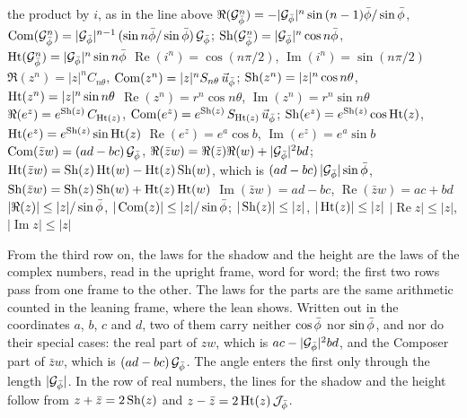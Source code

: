 \begin{gnlawswide}
  {the product by $i$, \newline as in the line above}
  {$\Re(\mathcal{G}_{\bar{\phi}}^n) = -|\mathcal{G}_{\bar{\phi}}|^n\sin\,(n - 1)\bar{\phi}/\sin\bar{\phi}$, \quad $\operatorname{Com}(\mathcal{G}_{\bar{\phi}}^n) = |\mathcal{G}_{\bar{\phi}}|^{n-1}\,(\sin n\bar{\phi}/\sin\bar{\phi})\,\mathcal{G}_{\bar{\phi}}$; \newline $\operatorname{Sh}(\mathcal{G}_{\bar{\phi}}^n) = |\mathcal{G}_{\bar{\phi}}|^n\cos n\bar{\phi}$, \quad $\operatorname{Ht}(\mathcal{G}_{\bar{\phi}}^n) = |\mathcal{G}_{\bar{\phi}}|^n\sin n\bar{\phi}$}
  {$\operatorname{Re}(i^n) = \cos(n\pi/2)$, \newline $\operatorname{Im}(i^n) = \sin(n\pi/2)$}
  {$\Re(z^n) = |z|^n C_{n\theta}$, \quad $\operatorname{Com}(z^n) = |z|^n S_{n\theta}\,\vec{u}_{\bar{\phi}}$; \newline $\operatorname{Sh}(z^n) = |z|^n\cos n\theta$, \quad $\operatorname{Ht}(z^n) = |z|^n\sin n\theta$}
  {$\operatorname{Re}(z^n) = r^n\cos n\theta$, \newline $\operatorname{Im}(z^n) = r^n\sin n\theta$}
  {$\Re(e^z) = e^{\operatorname{Sh}(z)}\,C_{\operatorname{Ht}(z)}$, \quad $\operatorname{Com}(e^z) = e^{\operatorname{Sh}(z)}\,S_{\operatorname{Ht}(z)}\,\vec{u}_{\bar{\phi}}$; \newline $\operatorname{Sh}(e^z) = e^{\operatorname{Sh}(z)}\cos\operatorname{Ht}(z)$, \quad $\operatorname{Ht}(e^z) = e^{\operatorname{Sh}(z)}\sin\operatorname{Ht}(z)$}
  {$\operatorname{Re}(e^z) = e^a\cos b$, \newline $\operatorname{Im}(e^z) = e^a\sin b$}
  {$\operatorname{Com}(\bar{z}w) = (ad - bc)\,\mathcal{G}_{\bar{\phi}}$, \quad $\Re(\bar{z}w) = \Re(\bar{z})\Re(w) + |\mathcal{G}_{\bar{\phi}}|^2 bd$; \newline $\operatorname{Ht}(\bar{z}w) = \operatorname{Sh}(z)\operatorname{Ht}(w) - \operatorname{Ht}(z)\operatorname{Sh}(w)$, which is $(ad - bc)\,|\mathcal{G}_{\bar{\phi}}|\sin\bar{\phi}$, \newline $\operatorname{Sh}(\bar{z}w) = \operatorname{Sh}(z)\operatorname{Sh}(w) + \operatorname{Ht}(z)\operatorname{Ht}(w)$}
  {$\operatorname{Im}(\bar{z}w) = ad - bc$, \newline $\operatorname{Re}(\bar{z}w) = ac + bd$}
  {$|\Re(z)| \le |z|/\sin\bar{\phi}$, \quad $|\operatorname{Com}(z)| \le |z|/\sin\bar{\phi}$; \newline $|\operatorname{Sh}(z)| \le |z|$, \quad $|\operatorname{Ht}(z)| \le |z|$}
  {$|\operatorname{Re} z| \le |z|$, \newline $|\operatorname{Im} z| \le |z|$}
\end{gnlawswide}
From the third row on, the laws for the shadow and the height are the laws of the complex numbers, read in the upright frame, word for word; the first two rows pass from one frame to the other. The laws for the parts are the same arithmetic counted in the leaning frame, where the lean shows. Written out in the coordinates $a$, $b$, $c$ and $d$, two of them carry neither $\cos\bar{\phi}$ nor $\sin\bar{\phi}$, and nor do their special cases: the real part of $zw$, which is $ac - |\mathcal{G}_{\bar{\phi}}|^2bd$, and the Composer part of $\bar{z}w$, which is $(ad - bc)\,\mathcal{G}_{\bar{\phi}}$. The angle enters the first only through the length $|\mathcal{G}_{\bar{\phi}}|$. In the row of real numbers, the lines for the shadow and the height follow from $z + \bar{z} = 2\operatorname{Sh}(z)$ and $z - \bar{z} = 2\operatorname{Ht}(z)\,\mathcal{J}_{\bar{\phi}}$.

